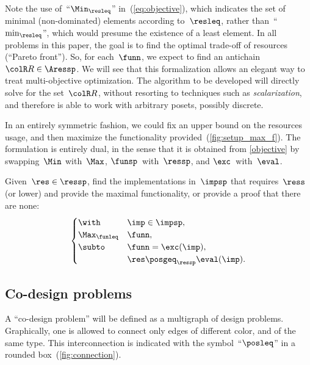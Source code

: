 \begin{remark}
Note the use of~``$\Min_{\resleq}$'' in~(\ref{eq:objective}),
which indicates the set of minimal (non-dominated) elements according
to~$\resleq$, rather than~``$\min_{\resleq}$'', which would
presume the existence of a least element. In all problems in this
paper, the goal is to find the optimal trade-off of resources (``Pareto
front''). So, for each~$\funn$, we expect to find an antichain~${\colR R}\in\Aressp$.
We will see that this formalization allows an elegant way to treat
multi-objective optimization. The algorithm to be developed will directly
solve for the set~${\colR R}$, without resorting to techniques such
as \emph{scalarization}, and therefore is able to work with arbitrary
posets, possibly discrete.
\end{remark}


In an entirely symmetric fashion, we could fix an upper bound on
the resources usage, and then maximize the functionality provided~(\cref{fig:setup_max_f}).
The formulation is entirely dual, in the sense that it is obtained
from \eqref{objective} by swapping~$\Min$ with~$\Max$, $\funsp$~with~$\ressp$,
and $\exc$~with~$\eval$.

\begin{problem}[FixResMinFun]
    Given~$\res\in\ressp$, find the implementations
in~$\impsp$ that requires~$\ress$ (or lower)
and provide the maximal functionality,  or provide a proof that there are none:
\begin{equation}
\begin{cases}
\with & \imp\in\impsp,\\
\Max_{\funleq} & \funn,\\
\subto & \funn=\exc(\imp),\\
 & \res\posgeq_{\ressp}\eval(\imp).
\end{cases}\label{eq:objective-1}
\end{equation}
\end{problem}





\subsection{Co-design problems\label{sec:Co-design-problems}}

A ``co-design problem'' will be defined as a multigraph of design
problems. Graphically, one is allowed to connect only edges of different
color, and of the same type. This interconnection is indicated with the symbol~``$\posleq$''
in a rounded box~(\cref{fig:connection}). 

